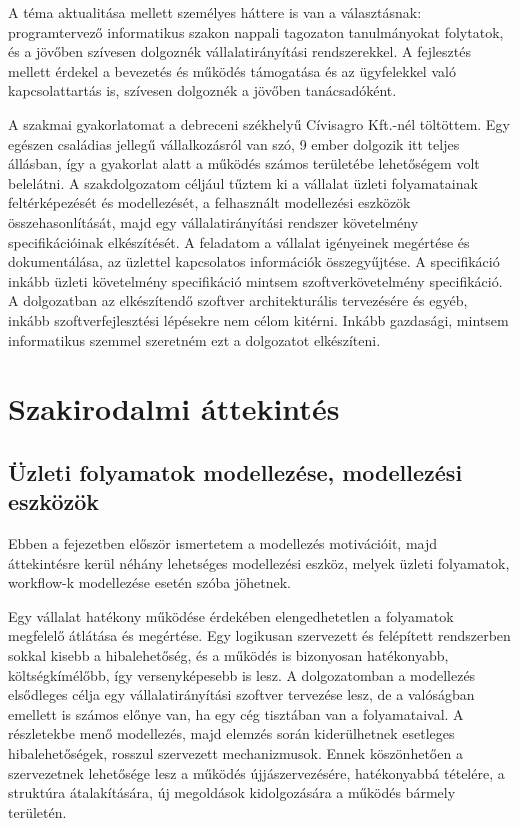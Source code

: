 \documentclass[12pt]{article}
\begin{document}
A téma aktualitása mellett személyes háttere is van a választásnak: programtervező informatikus szakon nappali tagozaton tanulmányokat folytatok, és a jövőben szívesen dolgoznék vállalatirányítási rendszerekkel. A fejlesztés mellett érdekel a bevezetés és működés támogatása és az ügyfelekkel való kapcsolattartás is, szívesen dolgoznék a jövőben tanácsadóként.

A szakmai gyakorlatomat a debreceni székhelyű Cívisagro Kft.-nél töltöttem. Egy egészen családias jellegű vállalkozásról van szó, 9 ember dolgozik itt teljes állásban, így a gyakorlat alatt a működés számos területébe lehetőségem volt belelátni. A szakdolgozatom céljául tűztem ki a vállalat üzleti folyamatainak feltérképezését és modellezését, a felhasznált modellezési eszközök összehasonlítását, majd egy vállalatirányítási rendszer követelmény specifikációinak elkészítését. A feladatom a vállalat igényeinek megértése és dokumentálása, az üzlettel kapcsolatos információk összegyűjtése. A specifikáció inkább üzleti követelmény specifikáció mintsem szoftverkövetelmény specifikáció. A dolgozatban az elkészítendő szoftver architekturális tervezésére és egyéb, inkább szoftverfejlesztési lépésekre nem célom kitérni. Inkább gazdasági, mintsem informatikus szemmel szeretném ezt a dolgozatot elkészíteni.


\newpage
\section{Szakirodalmi áttekintés}

\subsection{Üzleti folyamatok modellezése, modellezési eszközök}
Ebben a fejezetben először ismertetem a modellezés motivációit, majd áttekintésre kerül néhány lehetséges modellezési eszköz, melyek üzleti folyamatok, workflow-k modellezése esetén szóba jöhetnek.

Egy vállalat hatékony működése érdekében elengedhetetlen a folyamatok megfelelő átlátása és megértése. Egy logikusan szervezett és felépített rendszerben sokkal kisebb a hibalehetőség, és a működés is bizonyosan hatékonyabb, költségkímélőbb, így versenyképesebb is lesz. A dolgozatomban a modellezés elsődleges célja egy vállalatirányítási szoftver tervezése lesz, de a valóságban emellett is számos előnye van, ha egy cég tisztában van a folyamataival. A részletekbe menő modellezés, majd elemzés során kiderülhetnek esetleges hibalehetőségek, rosszul szervezett mechanizmusok. Ennek köszönhetően a szervezetnek lehetősége lesz a működés újjászervezésére, hatékonyabbá tételére, a struktúra átalakítására, új megoldások kidolgozására a működés bármely területén.
\end{document}
